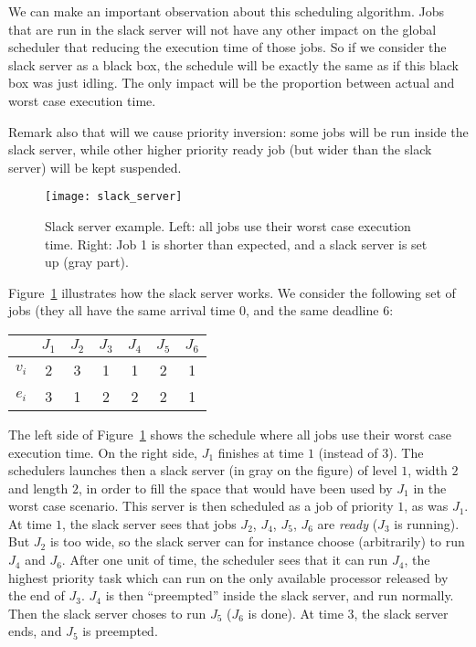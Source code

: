 \documentclass[a4paper]{article}
\begin{document}
We can make an important observation about this scheduling algorithm. Jobs that are run in the slack server will not have any other impact on the global scheduler that reducing the execution time of those jobs. So if we consider the slack server as a black box, the schedule will be exactly the same as if this black box was just idling. The only impact will be the proportion between actual and worst case execution time.

Remark also that will we cause priority inversion: some jobs will be run inside the slack server, while other higher priority ready job (but wider than the slack server) will be kept suspended.

\begin{figure}
\begin{center}
\texttt{[image: slack\_server]}
\caption{\label{fig:slackServer}Slack server example. Left: all jobs use their worst case execution time. Right: Job 1 is shorter than expected, and a slack server is set up (gray part).} 
\end{center}\end{figure}

Figure~\ref{fig:slackServer} illustrates how the slack server works. We consider the following set of jobs (they all have the same arrival time $0$, and the same deadline $6$:
\begin{center}
\begin{tabular}{|c|c|c|c|c|c|c|}
\hline
			& $J_1$		& $J_2$ 	&	$J_3$	& $J_4$		& $J_5$		& $J_6$ \\ \hline
$v_i$ 	& 2        	&  3			& 1 			& 1			& 2			& 1 \\ \hline
$e_i$ 	& 3        	&  1			& 2 			& 2			& 2			& 1 \\ \hline
\end{tabular} 
\end{center}

The left side of Figure~\ref{fig:slackServer} shows the schedule where all jobs use their worst case execution time.
On the right side, $J_1$ finishes at time $1$ (instead of $3$). The schedulers launches then a slack server (in gray on the figure) of level $1$, width $2$ and length $2$, in order to fill the space that would have been used by $J_1$ in the worst case scenario. This server is then scheduled as a job of priority $1$, as was $J_1$. At time $1$, the slack server sees that jobs $J_2$, $J_4$, $J_5$, $J_6$ are \emph{ready} ($J_3$ is running). But $J_2$ is too wide, so the slack server can for instance choose (arbitrarily) to run $J_4$ and $J_6$. After one unit of time, the scheduler sees that it can run $J_4$, the highest priority task which can run on the only available processor released by the end of $J_3$. $J_4$ is then ``preempted'' inside the slack server, and run normally. Then the slack server choses to run $J_5$ ($J_6$ is done). At time $3$, the slack server ends, and $J_5$ is preempted. 
\end{document}
